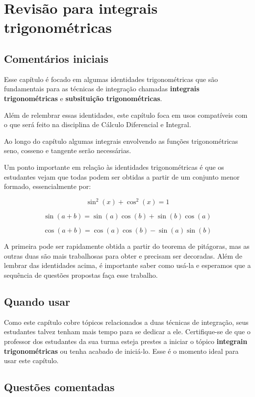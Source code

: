 \documentclass[main_estudante.tex]{subfiles}
\begin{document}
\chapter{Revisão para integrais trigonométricas}

\section{Comentários iniciais}

Esse capítulo é focado em algumas identidades trigonométricas que são fundamentais para as técnicas de integração chamadas \textbf{integrais trigonométricas} e \textbf{subsituição trigonométricas}.

Além de relembrar essas identidades, este capítulo foca em usos compatíveis com o que será feito na disciplina de Cálculo Diferencial e Integral.

Ao longo do capítulo algumas integrais envolvendo as funções trigonométricas seno, cosseno e tangente serão necessárias.

Um ponto importante em relação às identidades trigonométricas é que os estudantes vejam que todas podem ser obtidas a partir de um conjunto menor formado, essencialmente por:

$$\sin^2(x)+\cos^2(x)=1$$

$$\sin(a+b)=\sin(a)\cos(b)+\sin(b)\cos(a)$$

$$\cos(a+b)=\cos(a)\cos(b)-\sin(a)\sin(b) $$

A primeira pode ser rapidamente obtida a partir do teorema de pitágoras, mas as outras duas são mais trabalhosas para obter e precisam ser decoradas. Além de lembrar das identidades acima, é importante saber como usá-la e esperamos que a sequência de questões propostas faça esse trabalho.

\section{Quando usar}

Como este capítulo cobre tópicos relacionados a duas técnicas de integração, seus estudantes talvez tenham mais tempo para se dedicar a ele. Certifique-se de que o professor dos estudantes da sua turma esteja prestes a iniciar o tópico \textbf{integrain trigonométricas} ou tenha acabado de iniciá-lo. Esse é o momento ideal para usar este capítulo.

\section{Questões comentadas}
\end{document}

